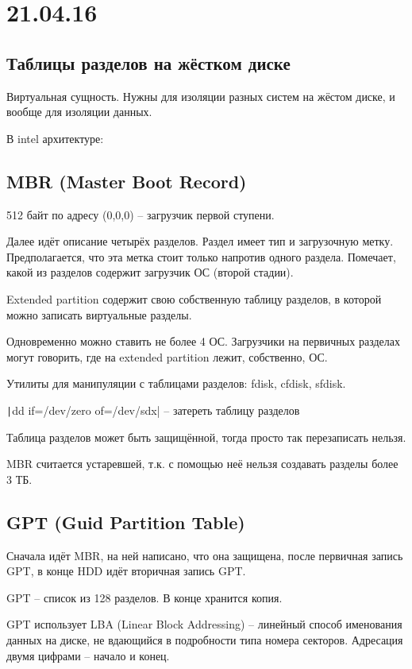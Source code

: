 \documentclass[a4paper,10pt]{article}
\begin{document}
\section{21.04.16}
\subsection{Таблицы разделов на жёстком диске}
Виртуальная сущность. Нужны для изоляции разных систем на жёстом диске, и вообще для изоляции данных.

В intel архитектуре:

\subsection{MBR (Master Boot Record)}
512 байт по адресу (0,0,0)  -- загрузчик первой ступени.

Далее идёт описание четырёх разделов. Раздел имеет тип и загрузочную метку. Предполагается, что эта метка стоит только напротив одного раздела. Помечает, какой из разделов содержит загрузчик ОС (второй стадии).

Extended partition содержит свою собственную таблицу разделов, в которой можно записать виртуальные разделы.

Одновременно можно ставить не более 4 ОС. Загрузчики на первичных разделах могут говорить, где на extended partition лежит, собственно, ОС.

Утилиты для манипуляции с таблицами разделов: fdisk, cfdisk, sfdisk.

\texttt|dd if=/dev/zero of=/dev/sdx|  -- затереть таблицу разделов

Таблица разделов может быть защищённой, тогда просто так перезаписать нельзя.

MBR считается устаревшей, т.к. с помощью неё нельзя создавать разделы более 3 ТБ.

\subsection{GPT (Guid Partition Table)}
Сначала идёт MBR, на ней написано, что она защищена, после первичная запись GPT, в конце HDD идёт вторичная запись GPT.

GPT -- список из 128 разделов. В конце хранится копия.

GPT использует LBA (Linear Block Addressing) -- линейный способ именования данных на диске, не вдающийся в подробности типа номера секторов. Адресация двумя цифрами -- начало и конец.
\end{document}
